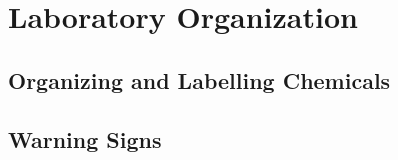 \section{Laboratory Organization}

\subsection{Organizing and Labelling Chemicals}

\subsection{Warning Signs}